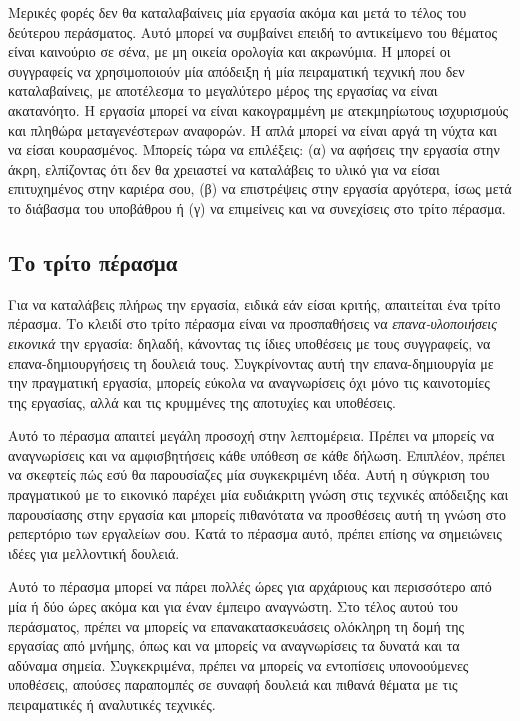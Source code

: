 \documentclass{article}
\begin{document}
\par
Μερικές φορές δεν θα καταλαβαίνεις μία εργασία ακόμα και μετά το τέλος του δεύτερου περάσματος. Αυτό μπορεί να συμβαίνει επειδή το αντικείμενο του θέματος είναι καινούριο σε σένα, με μη οικεία ορολογία και ακρωνύμια. Ή μπορεί οι συγγραφείς να χρησιμοποιούν μία απόδειξη ή μία πειραματική τεχνική που δεν καταλαβαίνεις, με αποτέλεσμα το μεγαλύτερο μέρος της εργασίας να είναι ακατανόητο. Η εργασία μπορεί να είναι κακογραμμένη με ατεκμηρίωτους ισχυρισμούς και πληθώρα μεταγενέστερων αναφορών. Ή απλά μπορεί να είναι αργά τη νύχτα και να είσαι κουρασμένος. Μπορείς τώρα να επιλέξεις: (α) να αφήσεις την εργασία στην άκρη, ελπίζοντας ότι δεν θα χρειαστεί να καταλάβεις το υλικό για να είσαι επιτυχημένος στην καριέρα σου, (β) να επιστρέψεις στην εργασία αργότερα, ίσως μετά το διάβασμα του υποβάθρου ή (γ) να επιμείνεις και να συνεχίσεις στο τρίτο πέρασμα.
\subsection{Το τρίτο πέρασμα}
\par
Για να καταλάβεις πλήρως την εργασία, ειδικά εάν είσαι κριτής, απαιτείται ένα τρίτο πέρασμα. Το κλειδί στο τρίτο πέρασμα είναι να προσπαθήσεις να \textit{επανα-υλοποιήσεις εικονικά} την εργασία: δηλαδή, κάνοντας τις ίδιες υποθέσεις με τους συγγραφείς, να επανα-δημιουργήσεις τη δουλειά τους. Συγκρίνοντας αυτή την επανα-δημιουργία με την πραγματική εργασία, μπορείς εύκολα να αναγνωρίσεις όχι μόνο τις καινοτομίες της εργασίας, αλλά και τις κρυμμένες της αποτυχίες και υποθέσεις.
\par
Αυτό το πέρασμα απαιτεί μεγάλη προσοχή στην λεπτομέρεια. Πρέπει να μπορείς να αναγνωρίσεις και να αμφισβητήσεις κάθε υπόθεση σε κάθε δήλωση. Επιπλέον, πρέπει να σκεφτείς πώς εσύ θα παρουσίαζες μία συγκεκριμένη ιδέα. Αυτή η σύγκριση του πραγματικού με το εικονικό παρέχει μία ευδιάκριτη γνώση στις τεχνικές απόδειξης και παρουσίασης στην εργασία και μπορείς πιθανότατα να προσθέσεις αυτή τη γνώση στο ρεπερτόριο των εργαλείων σου. Κατά το πέρασμα αυτό, πρέπει επίσης να σημειώνεις ιδέες για μελλοντική δουλειά.
\par
Αυτό το πέρασμα μπορεί να πάρει πολλές ώρες για αρχάριους και περισσότερο από μία ή δύο ώρες ακόμα και για έναν έμπειρο αναγνώστη. Στο τέλος αυτού του περάσματος, πρέπει να μπορείς να επανακατασκευάσεις ολόκληρη τη δομή της εργασίας από μνήμης, όπως και να μπορείς να αναγνωρίσεις τα δυνατά και τα αδύναμα σημεία. Συγκεκριμένα, πρέπει να μπορείς να εντοπίσεις υπονοούμενες υποθέσεις, απούσες παραπομπές σε συναφή δουλειά και πιθανά θέματα με τις πειραματικές ή αναλυτικές τεχνικές.
\end{document}
